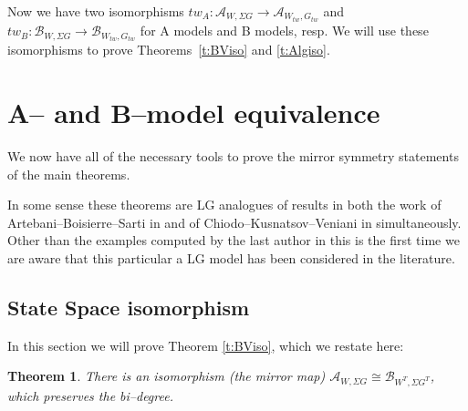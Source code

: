 \documentclass[10pt, letterpaper]{amsart}
\newtheorem{thm}{Theorem}%
\theoremstyle{remark}
\newcommand{\sA}{\mathscr{A}}
\newcommand{\sB}{\mathscr{B}}
\newcommand{\tw}[1]{{#1}_{tw}}
\newcommand{\s}[1]{\Sigma #1}
\begin{document}
Now we have two isomorphisms $tw_A:\sA_{W,\s G}\to \sA_{\tw W,\tw G}$ and $tw_B:\sB_{W,\s G}\to \sB_{\tw W,\tw G}$ for A models and B models, resp. We will use these isomorphisms to prove Theorems~\ref{t:BViso} and \ref{t:Algiso}. 









\section{A-- and B--model equivalence}\label{e:BVLGABmodeliso}
We now have all of the necessary tools to prove the mirror symmetry statements of the main theorems. 

In some sense these theorems are LG analogues of results in both the work of Artebani--Boisierre--Sarti in \cite{ABS} and of Chiodo--Kusnatsov--Veniani in \cite{CKV} simultaneously. Other than the examples computed by the last author in \cite{Schaug} this is the first time we are aware that this particular a LG model has been considered in the literature. 

\subsection{State Space isomorphism}
In this section we will prove Theorem \ref{t:BViso}, which we restate here:
\begin{thm}
There is an isomorphism (the mirror map) $\sA_{W,\s{G}}\cong \sB_{W^T,\s{G^T}}$, which preserves the bi--degree. 
\end{thm} 
\end{document}
